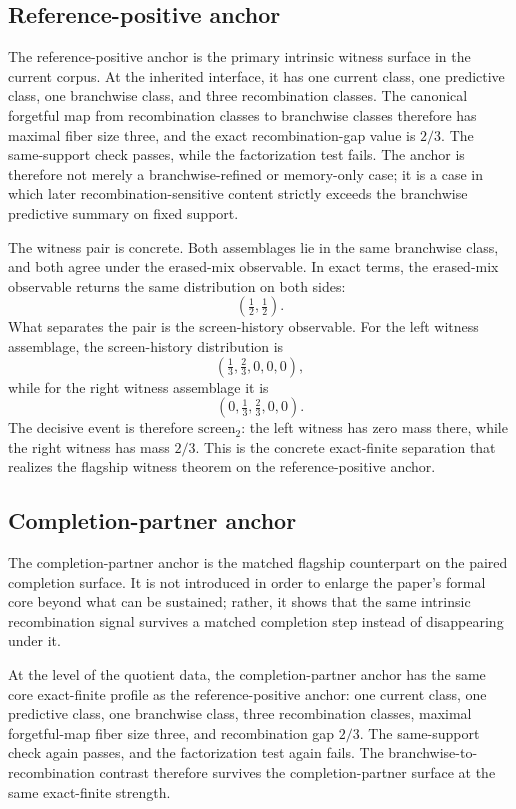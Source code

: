 \documentclass[11pt]{article}
\theoremstyle{definition}
\begin{document}
\subsection{Reference-positive anchor}

The reference-positive anchor is the primary intrinsic witness surface in the current corpus. At the inherited interface, it has one current class, one predictive class, one branchwise class, and three recombination classes. The canonical forgetful map from recombination classes to branchwise classes therefore has maximal fiber size three, and the exact recombination-gap value is \(2/3\). The same-support check passes, while the factorization test fails. The anchor is therefore not merely a branchwise-refined or memory-only case; it is a case in which later recombination-sensitive content strictly exceeds the branchwise predictive summary on fixed support.

The witness pair is concrete. Both assemblages lie in the same branchwise class, and both agree under the erased-mix observable. In exact terms, the erased-mix observable returns the same distribution on both sides:
\[
(\tfrac12,\tfrac12).
\]
What separates the pair is the screen-history observable. For the left witness assemblage, the screen-history distribution is
\[
(\tfrac13,\tfrac23,0,0,0),
\]
while for the right witness assemblage it is
\[
(0,\tfrac13,\tfrac23,0,0).
\]
The decisive event is therefore \(\mathrm{screen}_2\): the left witness has zero mass there, while the right witness has mass \(2/3\). This is the concrete exact-finite separation that realizes the flagship witness theorem on the reference-positive anchor.

\subsection{Completion-partner anchor}

The completion-partner anchor is the matched flagship counterpart on the paired completion surface. It is not introduced in order to enlarge the paper's formal core beyond what can be sustained; rather, it shows that the same intrinsic recombination signal survives a matched completion step instead of disappearing under it.

At the level of the quotient data, the completion-partner anchor has the same core exact-finite profile as the reference-positive anchor: one current class, one predictive class, one branchwise class, three recombination classes, maximal forgetful-map fiber size three, and recombination gap \(2/3\). The same-support check again passes, and the factorization test again fails. The branchwise-to-recombination contrast therefore survives the completion-partner surface at the same exact-finite strength.
\end{document}
